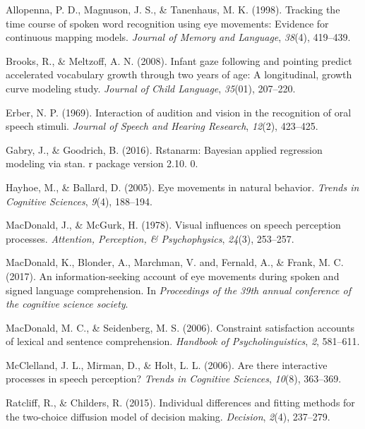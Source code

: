 \documentclass[10pt, letterpaper]{article}
\begin{document}
\setlength{\parindent}{-0.1in} \setlength{\leftskip}{0.125in} \noindent

\hypertarget{refs}{}
\hypertarget{ref-allopenna1998tracking}{}
Allopenna, P. D., Magnuson, J. S., \& Tanenhaus, M. K. (1998). Tracking
the time course of spoken word recognition using eye movements: Evidence
for continuous mapping models. \emph{Journal of Memory and Language},
\emph{38}(4), 419--439.

\hypertarget{ref-brooks2008infant}{}
Brooks, R., \& Meltzoff, A. N. (2008). Infant gaze following and
pointing predict accelerated vocabulary growth through two years of age:
A longitudinal, growth curve modeling study. \emph{Journal of Child
Language}, \emph{35}(01), 207--220.

\hypertarget{ref-erber1969interaction}{}
Erber, N. P. (1969). Interaction of audition and vision in the
recognition of oral speech stimuli. \emph{Journal of Speech and Hearing
Research}, \emph{12}(2), 423--425.

\hypertarget{ref-gabry2016rstanarm}{}
Gabry, J., \& Goodrich, B. (2016). Rstanarm: Bayesian applied regression
modeling via stan. r package version 2.10. 0.

\hypertarget{ref-hayhoe2005eye}{}
Hayhoe, M., \& Ballard, D. (2005). Eye movements in natural behavior.
\emph{Trends in Cognitive Sciences}, \emph{9}(4), 188--194.

\hypertarget{ref-macdonald1978visual}{}
MacDonald, J., \& McGurk, H. (1978). Visual influences on speech
perception processes. \emph{Attention, Perception, \& Psychophysics},
\emph{24}(3), 253--257.

\hypertarget{ref-macdonald2017info}{}
MacDonald, K., Blonder, A., Marchman, V. and, Fernald, A., \& Frank, M.
C. (2017). An information-seeking account of eye movements during spoken
and signed language comprehension. In \emph{Proceedings of the 39th
annual conference of the cognitive science society}.

\hypertarget{ref-macdonald2006constraint}{}
MacDonald, M. C., \& Seidenberg, M. S. (2006). Constraint satisfaction
accounts of lexical and sentence comprehension. \emph{Handbook of
Psycholinguistics}, \emph{2}, 581--611.

\hypertarget{ref-mcclelland2006there}{}
McClelland, J. L., Mirman, D., \& Holt, L. L. (2006). Are there
interactive processes in speech perception? \emph{Trends in Cognitive
Sciences}, \emph{10}(8), 363--369.

\hypertarget{ref-ratcliff2015individual}{}
Ratcliff, R., \& Childers, R. (2015). Individual differences and fitting
methods for the two-choice diffusion model of decision making.
\emph{Decision}, \emph{2}(4), 237--279.
\end{document}
